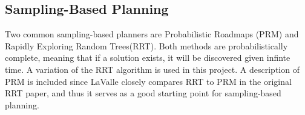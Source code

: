 \documentclass[12pt]{article}
\begin{document}
    \subsection{Sampling-Based Planning}
        Two common sampling-based planners are Probabilistic Roadmaps (PRM) and Rapidly Exploring Random Trees(RRT). Both methods are probabilistically complete, meaning that if a solution exists, it will be discovered given infinte time. A variation of the RRT algorithm is used in this project. A description of PRM is included since LaValle closely compares RRT to PRM in the original RRT paper, and thus it serves as a good starting point for sampling-based planning.\cite{lavalle_rapidly-exploring_1998}
        

        \iffalse
\end{document}
